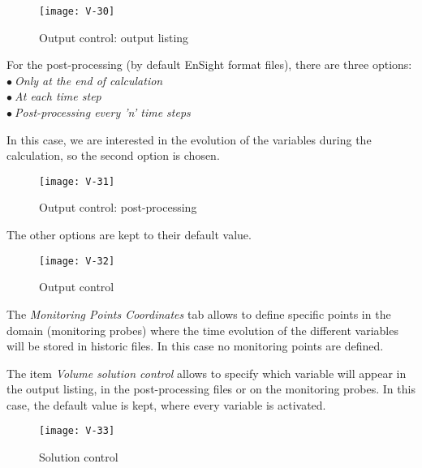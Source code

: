 \begin{figure}[ht]
\begin{center}
\texttt{[image: V-30]}
\caption{Output control: output listing}
\label{fig33_e1}
\end{center}
\end{figure}


\clearpage
For the post-processing (by default EnSight format files), there are three options:\\
\hspace*{1cm}$\bullet\ ${\itshape Only at the end of calculation}\\
\hspace*{1cm}$\bullet\ ${\itshape At each time step}\\
\hspace*{1cm}$\bullet\ ${\itshape Post-processing every 'n' time steps}

In this case, we are interested in the evolution of the variables during the
calculation, so the second option is chosen.

\begin{figure}[ht]
\begin{center}
\texttt{[image: V-31]}
\caption{Output control: post-processing}
\label{fig34_e1}
\end{center}
\end{figure}


\clearpage
The other options are kept to their default value.

\begin{figure}[ht]
\begin{center}
\texttt{[image: V-32]}
\caption{Output control}
\label{fig35_e1}
\end{center}
\end{figure}

The {\itshape Monitoring Points Coordinates} tab allows to define specific points
in the domain (monitoring probes) where the time evolution of the different
variables will be stored in historic files. In this case no monitoring points
are defined.


\clearpage
The item {\itshape Volume solution control} allows to specify which variable will
appear in the output listing, in the post-processing files or on the
monitoring probes. In this case, the default value is kept, where every variable
is activated.


\begin{figure}[ht]
\begin{center}
\texttt{[image: V-33]}
\caption{Solution control}
\label{fig36_e1}
\end{center}
\end{figure}


